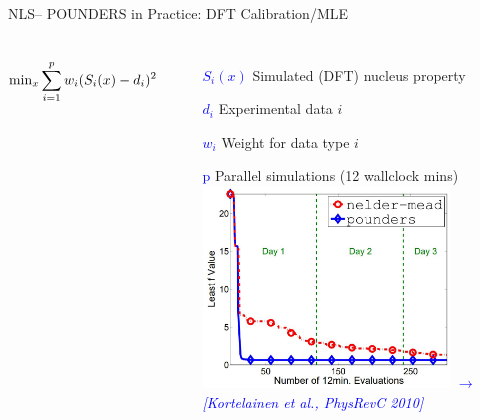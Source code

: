 \documentclass[handout,aspectratio=54]{beamer}
\numberwithin{theorem}{section}
\begin{document}
\begin{frame}{NLS– POUNDERS in Practice: DFT Calibration/MLE}
\begin{columns}\footnotesize
{}
\begin{equation*}
\textup{min}_x\sum_{i=1}^pw_i(S_i(x)-d_i)^2
\end{equation*}

\begin{itemize}
\item[\textcolor{blue}{$S_i(x)$}] Simulated (DFT) nucleus property
\item[\textcolor{blue}{$d_i$}]  Experimental data $i$
\item[\textcolor{blue}{$w_i$}]  Weight for data type $i$
\item[\textcolor{blue}{p}]  Parallel simulations (12 wallclock mins)
\includegraphics[width=0.8\textwidth]{fig/47-1.jpg}
\tiny\flushright\textcolor{blue}{\emph{$\rightarrow$ [Kortelainen et al., PhysRevC 2010]}}
\end{itemize}


\end{columns}
\end{frame}
\end{document}
